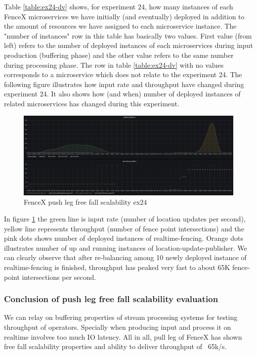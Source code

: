 \documentclass[a4]{report}
\begin{document}
    Table \ref{table:ex24-dv} shows, for experiment 24, how many instances of each FenceX microservices we have
    initially (and eventually) deployed in addition to the amount of resources we have assigned to each microservice
    instance.
    The "number of instances" row in this table has basically two values.
    First value (from left) refers to the number of deployed instances of each microservices during input production
    (buffering phase) and the other value refers to the same number during processing phase.
    The row in table \ref{table:ex24-dv} with no values corresponds to a microservice which does not relate to the
    experiment 24.
    The following figure illustrates how input rate and throughput have changed during experiment 24.
    It also shows how (and when) number of deployed instances of related microservices has changed during this
    experiment.

    \clearpage

    \begin{figure}[h!]
        \centering
        \caption{FenceX push leg free fall scalability ex24}
        \label{fig:ex24}
        \includegraphics[width=\linewidth, scale=2]{images/evaluation/ex24-benchmarking-ongoing-1per2sec.png}
    \end{figure}

    In figure \ref{fig:ex24} the green line is input rate (number of location updates per second),
    yellow line represents throughput (number of fence point intersections) and the pink dots shows number of
    deployed instances of realtime-fencing.
    Orange dots illustrates number of up and running instances of location-update-publisher.
    We can clearly observe that after re-balancing among 10 newly deployed instance of realtime-fencing is finished,
    throughput has peaked very fast to about 65K fence-point intersections per second.

    \subsubsection{Conclusion of push leg free fall scalability evaluation}
    We can relay on buffering properties of stream processing systems for testing throughput of operators.
    Specially when producing input and process it on realtime involves too much IO latency.
    All in all, pull leg of FenceX has shown free fall scalability properties and ability to deliver throughput of
    ~65k/s.
\end{document}
